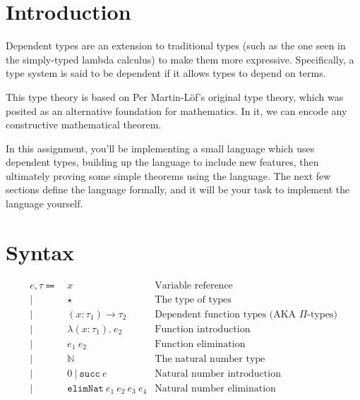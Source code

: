 \documentclass[12pt]{article}
\date{}
\title{}
\begin{document}
\section*{Introduction}
\label{sec:org7d8150d}

Dependent types are an extension to traditional types (such as the one seen in the simply-typed lambda calculus) to make them more expressive. Specifically, a type system is said to be dependent if it allows types to depend on terms. 

This type theory is based on Per Martin-Löf's original type theory, which was posited as an alternative foundation for mathematics. In it, we can encode any constructive mathematical theorem.

In this assignment, you'll be implementing a small language which uses dependent types, building up the language to include new features, then ultimately proving some simple theorems using the language. The next few sections define the language formally, and it will be your task to implement the language yourself.

\section*{Syntax}
\label{sec:orgbe495e9}

\begin{align*}
e, \tau \Coloneqq&\ x                           & \text{Variable reference} \\
  |&\ \star                               & \text{The type of types} \\
  |&\ (x : \tau_1) \rightarrow \tau_2           & \text{Dependent function types (AKA $\Pi$-types)}\\
  |&\ \lambda (x : \tau_1).\ e_2               & \text{Function introduction} \\
  |&\ e_1\ e_2                            & \text{Function elimination}\\
  |&\ \mathbb{N}                          & \text{The natural number type}\\
  |&\ 0\ |\ \mathtt{succ}\ e              & \text{Natural number introduction}\\
  |&\ \mathtt{elimNat}\ e_1\ e_2\ e_3\ e_4 & \text{Natural number elimination}
\end{align*}
\end{document}
